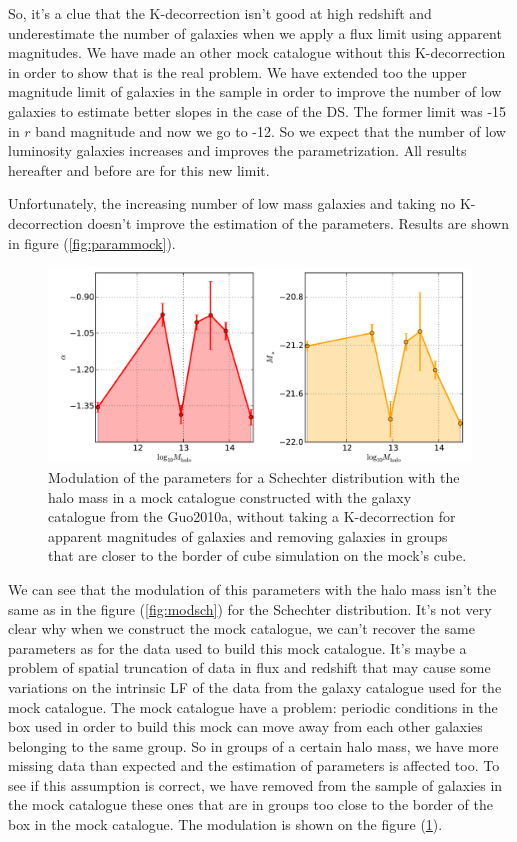 So, it's a clue that the K-decorrection isn't good at high redshift and
underestimate the number of galaxies when we apply a flux limit using apparent
magnitudes. We have made an other mock catalogue without this K-decorrection in
order to show that is the real problem. We have extended too the upper
magnitude limit of galaxies in the sample in order to improve the number of low
galaxies to estimate better slopes in the case of the DS\@. The former limit
was -15 in $r$ band magnitude and now we go to -12. So we expect that the
number of low luminosity galaxies increases and improves the parametrization.
All results hereafter and before are for this new limit.

Unfortunately, the increasing number of low mass galaxies and taking no
K-decorrection doesn't improve the estimation of the parameters. Results are
shown in figure (\ref{fig:parammock}).
%
\begin{figure}[htb]
    \centering
    \includegraphics[width=0.8\linewidth]{figures/lf/evolSchechterMockNoBorder}
    \caption{Modulation of the parameters for a Schechter distribution with the
        halo mass in a mock catalogue constructed with the galaxy catalogue
        from the Guo2010a, without taking a K-decorrection for apparent
        magnitudes of galaxies and removing galaxies in groups that are closer
    to the border of cube simulation on the mock's cube.}
\label{fig:parammocknoborder}
\end{figure}

We can see that the modulation of this parameters with the halo mass isn't the
same as in the figure (\ref{fig:modsch}) for the Schechter distribution. It's
not very clear why when we construct the mock catalogue, we can't recover the
same parameters as for the data used to build this mock catalogue. It's maybe a
problem of spatial truncation of data in flux and redshift that may cause some
variations on the intrinsic LF of the data from the galaxy catalogue used for
the mock catalogue. The mock catalogue have a problem: periodic conditions in
the box used in order to build this mock can move away from each other galaxies
belonging to the same group. So in groups of a certain halo mass, we have more
missing data than expected and the estimation of parameters is affected too. To
see if this assumption is correct, we have removed from the sample of galaxies
in the mock catalogue these ones that are in groups too close to the border of
the box in the mock catalogue. The modulation is shown on the figure
(\ref{fig:parammocknoborder}).

